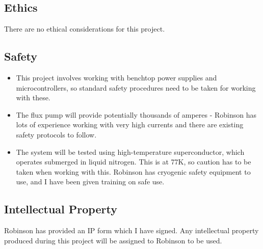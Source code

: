 \documentclass[11pt, a4paper, twoside, openright]{article}
\begin{document}

\subsection{Ethics}
There are no ethical considerations for this project.

\subsection{Safety}
\begin{itemize}
	\item This project involves working with benchtop power supplies and microcontrollers, so standard safety procedures need to be taken for working with these.
	\item The flux pump will provide potentially thousands of amperes - Robinson has lots of experience working with very high currents and there are existing safety protocols to follow.
	\item The system will be tested using high-temperature superconductor, which operates submerged in liquid nitrogen. This is at 77K, so caution has to be taken when working with this. Robinson has cryogenic safety equipment to use, and I have been given training on safe use.
\end{itemize}

\subsection{Intellectual Property}
Robinson has provided an IP form which I have signed. Any intellectual property produced during this project will be assigned to Robinson to be used. 


% 
% 
\printbibliography

\end{document}
